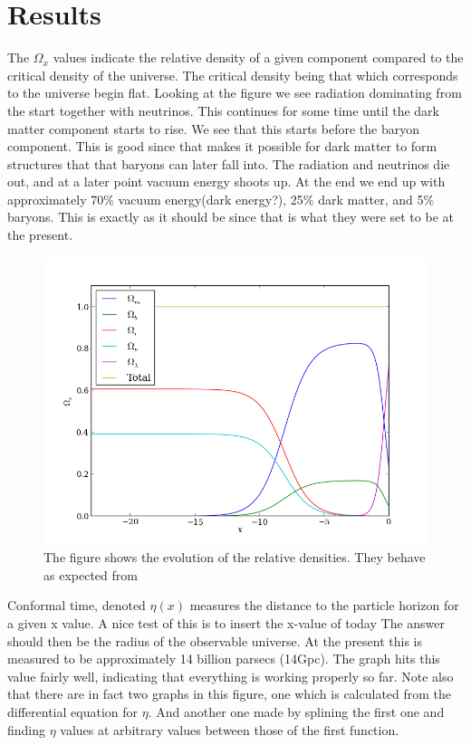 \documentclass{aa}   %
\begin{document}
\section{Results}\label{sec:simulate_analytic}
 The $\Omega_x$ values indicate the relative density of a given component compared to the critical density of the universe. 
 The critical density being that which corresponds to the universe begin flat.
 Looking at the figure we see radiation dominating from the start together with neutrinos.
 This continues for some time until the dark matter component starts to rise.
 We see that this starts before the baryon component. This is good since that makes it possible for dark matter to form structures that that baryons can later fall into. The radiation and neutrinos die out, and at a later point vacuum energy shoots up. At the end we end up with approximately 70\% vacuum energy(dark energy?), 25\% dark matter, and 5\% baryons. This is exactly as it should be since that is what they were set to be at the present.
 \begin{figure}
  \includegraphics[width=.49\textwidth]{figure_0.png}
  \caption{The figure shows the evolution of the relative densities. They behave as expected from}
 \label{figure0}
 \end{figure}
 
 Conformal time, denoted $\eta(x)$ measures the distance to the particle horizon for a given x value. A nice test of this is to insert the x-value of today 
 The answer should then be the radius of the observable universe. At the present this is measured to be approximately 14 billion parsecs (14Gpc). 
 The graph hits this value fairly well, indicating that everything is working properly so far. 
 Note also that there are in fact two graphs in this figure, one which is calculated from the differential equation for $\eta$. 
 And another one made by splining the first one and finding $\eta$ values at arbitrary values between those of the first function.
 
\end{document}
